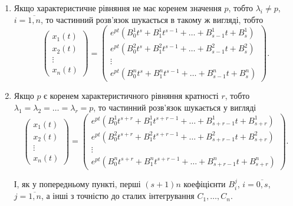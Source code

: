 \begin{enumerate}
	\begin{enumerate}
		\item Якщо характеристичне рівняння не має коренем значення $p$, тобто $\lambda_i \ne p$, $i = \overline{1, n}$, то частинний розв'язок шукається в такому ж вигляді, тобто
		\begin{equation*}
			\begin{pmatrix} x_1(t) \\ x_2(t) \\ \vdots \\ x_n(t) \end{pmatrix} =
			\begin{pmatrix} e^{pt} (B_0^1 t^s + B_1^1 t^{s - 1} + \ldots + B_{s - 1}^1 t + B_s^1) \\ e^{pt} (B_0^2 t^s + B_1^2 t^{s - 1} + \ldots + B_{s - 1}^2 t + B_s^2) \\ \vdots \\ e^{pt} (B_0^n t^s + B_1^n t^{s - 1} + \ldots + B_{s - 1}^n t + B_s^n) \end{pmatrix}.
		\end{equation*}

		\item Якщо $p$ є коренем характеристичного рівняння кратності $r$, тобто $\lambda_1 = \lambda_2 = \ldots = \lambda_r = p$, то частинний розв'язок шукається у вигляді
		\begin{equation*}
			\begin{pmatrix} x_1(t) \\ x_2(t) \\ \vdots \\ x_n(t) \end{pmatrix} =
			\begin{pmatrix} e^{pt} (B_0^1 t^{s + r} + B_1^1 t^{s + r - 1} + \ldots + B_{s + r - 1}^1 t + B_{s + r}^1) \\ e^{pt} (B_0^2 t^{s + r} + B_1^2 t^{s + r - 1} + \ldots + B_{s + r - 1}^2 t + B_{s + r}^2) \\ \vdots \\ e^{pt} (B_0^n t^{s + r} + B_1^n t^{s + r - 1} + \ldots + B_{s + r - 1}^n t + B_{s + r}^n) \end{pmatrix}.
		\end{equation*}

		І, як у попередньому пункті, перші $(s + 1) n$ коефіцієнти $B_i^j$, $i = \overline{0, s}$, $j = \overline{1, n}$, а інші з точністю до сталих інтегрування $C_1, \ldots, C_n$.
	\end{enumerate}
	

\end{enumerate}
